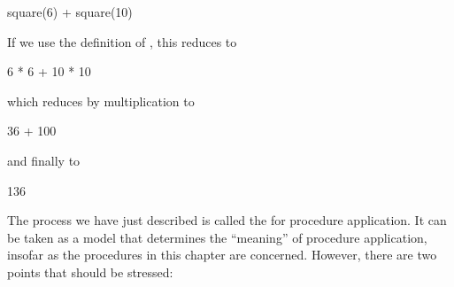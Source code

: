 \begin{syntaxForm}
square(6) + square(10)
\end{syntaxForm}

\noindent
If we use the definition of , this reduces to

\begin{syntaxForm}
6 * 6 + 10 * 10
\end{syntaxForm}

\noindent
which reduces by multiplication to

\begin{syntaxForm}
36 + 100
\end{syntaxForm}

\noindent
and finally to

\begin{syntaxForm}
136
\end{syntaxForm}

\noindent
The process we have just described is called the 
for procedure application.  It can be taken as a model that determines the
``meaning'' of procedure application, insofar as the procedures in this chapter
are concerned.  However, there are two points that should be stressed:

